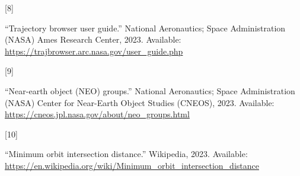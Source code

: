 \documentclass[
]{article}
\newlength{\cslhangindent}
\newlength{\csllabelwidth}
\newlength{\cslentryspacingunit} %
\newenvironment{CSLReferences}[2] %
 {%
  \setlength{\parindent}{0pt}
  \ifodd #1
  \let\oldpar\par
  \def\par{\hangindent=\cslhangindent\oldpar}
  \fi
  \setlength{\parskip}{#2\cslentryspacingunit}
 }%
 {}
\newcommand{\CSLLeftMargin}[1]{\parbox[t]{\csllabelwidth}{#1}}
\newcommand{\CSLRightInline}[1]{\parbox[t]{\linewidth - \csllabelwidth}{#1}\break}
\begin{document}
\begin{CSLReferences}{0}{0}
\leavevmode{}%
\CSLLeftMargin{{[}8{]} }%
\CSLRightInline{{``Trajectory browser user guide.''} National
Aeronautics; Space Administration (NASA) Ames Research Center, 2023.
Available: \url{https://trajbrowser.arc.nasa.gov/user_guide.php}}

\leavevmode{}%
\CSLLeftMargin{{[}9{]} }%
\CSLRightInline{{``Near-earth object (NEO) groups.''} National
Aeronautics; Space Administration (NASA) Center for Near-Earth Object
Studies (CNEOS), 2023. Available:
\url{https://cneos.jpl.nasa.gov/about/neo_groups.html}}

\leavevmode{}%
\CSLLeftMargin{{[}10{]} }%
\CSLRightInline{{``Minimum orbit intersection distance.''} Wikipedia,
2023. Available:
\url{https://en.wikipedia.org/wiki/Minimum_orbit_intersection_distance}}

\end{CSLReferences}
\end{document}
